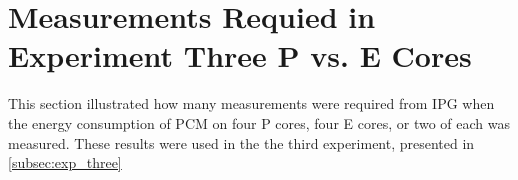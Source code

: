 \section*{Measurements Requied in Experiment Three P vs. E Cores}\label{app:p-vs-e}

This section illustrated how many measurements were required from IPG when the energy consumption of PCM on four P cores, four E cores, or two of each was measured. These results were used in the the third experiment, presented in \cref{subsec:exp_three}





% 
% 
% 
% 